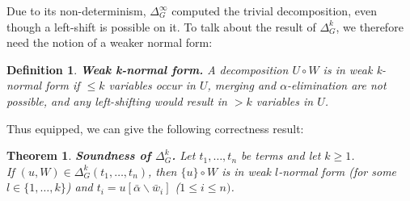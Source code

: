 \documentclass[a4paper, 11pt]{report}
\newtheorem{theorem}{Theorem}
\newtheorem{definition}{Definition}
\begin{document}
Due to its non-determinism, $\Delta_G^\infty$ computed the trivial decomposition, even though a left-shift is possible on it. To talk about the result of $\Delta_G^k$, we therefore need the notion of a weaker normal form:

\begin{definition}
\textbf{Weak k-normal form.}
A decomposition $U \circ W$ is in weak k-normal form if $\leq k$ variables occur in $U$, merging and $\alpha$-elimination are not possible, and any left-shifting would result in $> k$ variables in $U$.
\end{definition}

\noindent
Thus equipped, we can give the following correctness result:



\begin{theorem}
\textbf{Soundness of $\Delta_G^k$.}
Let $t_1,\dots,t_n$ be terms and let $k\geq 1$.\\
If $(u,W) \in \Delta_G^k(t_1,\dots,t_n)$, then $\{u\} \circ W$ is in weak $l$-normal form (for some $l \in \{1,\dots,k\}$) and $t_i = u[\bar{\alpha}\backslash\bar{w}_i]$ ($1\leq i \leq n)$.
\label{thm:DeltaGkSoundness}
\end{theorem}
\end{document}
